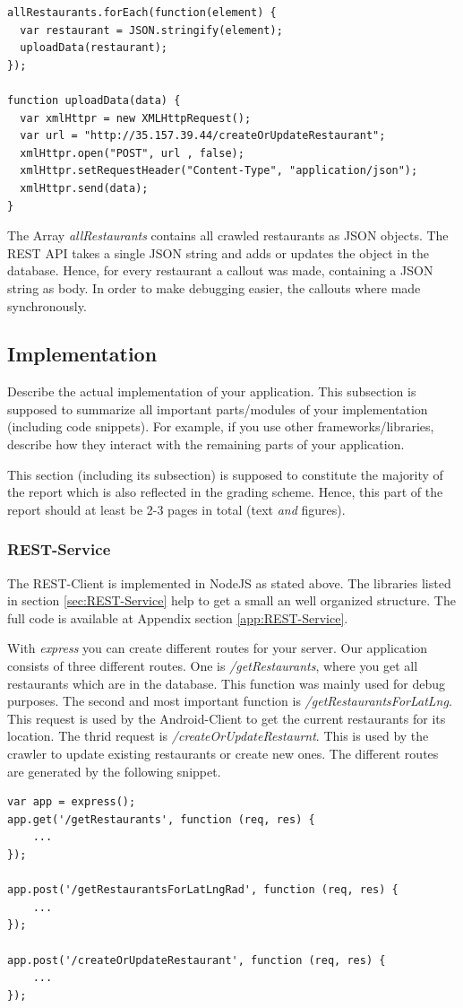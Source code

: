 \begin{lstlisting}
allRestaurants.forEach(function(element) {
  var restaurant = JSON.stringify(element);
  uploadData(restaurant);
});

function uploadData(data) {
  var xmlHttpr = new XMLHttpRequest();
  var url = "http://35.157.39.44/createOrUpdateRestaurant";
  xmlHttpr.open("POST", url , false);
  xmlHttpr.setRequestHeader("Content-Type", "application/json");
  xmlHttpr.send(data);
}
\end{lstlisting}

The Array \textit{allRestaurants} contains all crawled restaurants as JSON objects. The REST API takes a single JSON string and adds or updates the object in the database. Hence, for every restaurant a callout was made, containing a JSON string as body. In order to make debugging easier, the callouts where made synchronously.



\subsection{Implementation}

Describe the actual implementation of your application. This subsection is
supposed to summarize all important parts/modules of your implementation
(including code snippets). For example, if you use other frameworks/libraries,
describe how they interact with the remaining parts of your application.

This section (including its subsection) is supposed to constitute the majority
of the report which is also reflected in the grading scheme. Hence, this part of
the report should at least be 2-3 pages in total (text \emph{and} figures).

\subsubsection{REST-Service}
The REST-Client is implemented in NodeJS as stated above. The libraries listed in section \ref{sec:REST-Service} help to get a small an well organized structure. The full code is available at Appendix section \ref{app:REST-Service}.

With \textit{express} you can create different routes for your server. Our application consists of three different routes. One is \textit{/getRestaurants}, where you get all restaurants which are in the database. This function was mainly used for debug purposes. The second and most important function is \textit{/getRestaurantsForLatLng}. This request is used by the Android-Client to get the current restaurants for its location. The thrid request is \textit{/createOrUpdateRestaurnt}. This is used by the crawler to update existing restaurants or create new ones. The different routes are generated by the following snippet.
\begin{lstlisting}
var app = express();
app.get('/getRestaurants', function (req, res) {
	...
});

app.post('/getRestaurantsForLatLngRad', function (req, res) {
	...
});

app.post('/createOrUpdateRestaurant', function (req, res) {
	...
});
\end{lstlisting}

